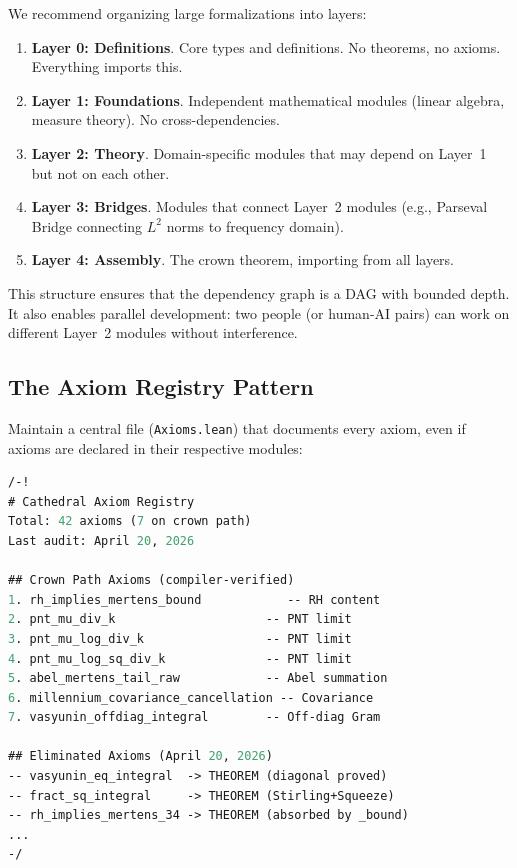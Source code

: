 \documentclass[11pt,a4paper]{article}
\newcommand{\lean}[1]{\texttt{#1}}
\begin{document}
We recommend organizing large formalizations into layers:

\begin{enumerate}
  \item \textbf{Layer 0: Definitions}. Core types and definitions.
    No theorems, no axioms. Everything imports this.
  \item \textbf{Layer 1: Foundations}. Independent mathematical
    modules (linear algebra, measure theory). No cross-dependencies.
  \item \textbf{Layer 2: Theory}. Domain-specific modules that may
    depend on Layer~1 but not on each other.
  \item \textbf{Layer 3: Bridges}. Modules that connect Layer~2
    modules (e.g., Parseval Bridge connecting $L^2$ norms to
    frequency domain).
  \item \textbf{Layer 4: Assembly}. The crown theorem, importing
    from all layers.
\end{enumerate}

This structure ensures that the dependency graph is a DAG with
bounded depth. It also enables parallel development: two people
(or human-AI pairs) can work on different Layer~2 modules without
interference.

\subsection{The Axiom Registry Pattern}

Maintain a central file (\lean{Axioms.lean}) that documents every
axiom, even if axioms are declared in their respective modules:

\begin{lstlisting}[language=ML,caption={Axiom registry pattern}]
/-!
# Cathedral Axiom Registry
Total: 42 axioms (7 on crown path)
Last audit: April 20, 2026

## Crown Path Axioms (compiler-verified)
1. rh_implies_mertens_bound            -- RH content
2. pnt_mu_div_k                     -- PNT limit
3. pnt_mu_log_div_k                 -- PNT limit
4. pnt_mu_log_sq_div_k              -- PNT limit
5. abel_mertens_tail_raw            -- Abel summation
6. millennium_covariance_cancellation -- Covariance
7. vasyunin_offdiag_integral        -- Off-diag Gram

## Eliminated Axioms (April 20, 2026)
-- vasyunin_eq_integral  -> THEOREM (diagonal proved)
-- fract_sq_integral     -> THEOREM (Stirling+Squeeze)
-- rh_implies_mertens_34 -> THEOREM (absorbed by _bound)
...
-/
\end{lstlisting}
\end{document}

